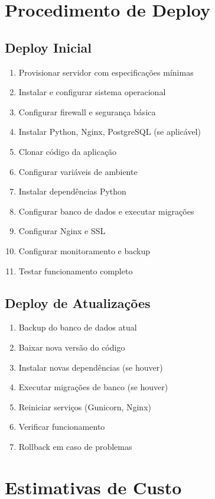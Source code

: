 \documentclass[12pt,a4paper]{article}
\begin{document}
\section{Procedimento de Deploy}

\subsection{Deploy Inicial}
\begin{enumerate}
    \item Provisionar servidor com especificações mínimas
    \item Instalar e configurar sistema operacional
    \item Configurar firewall e segurança básica
    \item Instalar Python, Nginx, PostgreSQL (se aplicável)
    \item Clonar código da aplicação
    \item Configurar variáveis de ambiente
    \item Instalar dependências Python
    \item Configurar banco de dados e executar migrações
    \item Configurar Nginx e SSL
    \item Configurar monitoramento e backup
    \item Testar funcionamento completo
\end{enumerate}

\subsection{Deploy de Atualizações}
\begin{enumerate}
    \item Backup do banco de dados atual
    \item Baixar nova versão do código
    \item Instalar novas dependências (se houver)
    \item Executar migrações de banco (se houver)
    \item Reiniciar serviços (Gunicorn, Nginx)
    \item Verificar funcionamento
    \item Rollback em caso de problemas
\end{enumerate}

\section{Estimativas de Custo}
\end{document}
